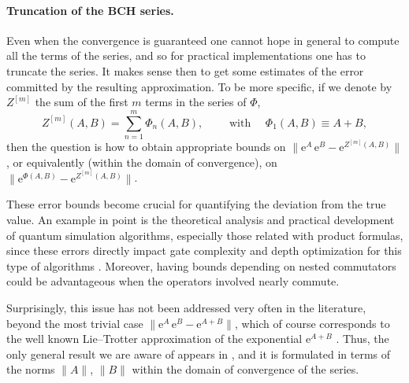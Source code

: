 \documentclass[11pt]{article}
\newcommand{\e}{\ensuremath{\mathrm{e}}}
\begin{document}
\paragraph{Truncation of the BCH series.} Even when the convergence  
is guaranteed one cannot hope in general to compute all the terms of the series, 
and so for practical implementations one has to truncate the series. It makes sense then to get some estimates of the error committed by the resulting 
approximation. To be more specific, if we denote by $Z^{[m]}$ the sum of the first $m$ terms in the series of $\Phi$, 
\begin{equation} \label{bch.2}
   Z^{[m]}(A,B) =  \sum_{n=1}^m \Phi_n(A,B),  \qquad \mbox{ with } \quad \Phi_1(A,B) \equiv A+B, 
\end{equation}
then the question is how to obtain appropriate bounds on $\|\e^{A} \, \e^{B} - \e^{Z^{[m]}(A,B)} \|$, or equivalently (within the domain of convergence), on $\|\e^{\Phi(A,B)} - \e^{Z^{[m]}(A,B)} \|$.

These error bounds become 
crucial for quantifying the deviation from the true value. An example in point is the theoretical analysis and practical development of quantum simulation algorithms, especially those related with product formulas, since these errors directly impact gate complexity and depth optimization for this type of algorithms \cite{childs21tot}. 
Moreover, having bounds depending on nested commutators could be advantageous when the operators involved nearly commute.

Surprisingly, this issue has not been addressed very often in the literature, beyond the most trivial case 
$\|\e^{A} \, \e^{B} - \e^{A+B} \|$, which of course corresponds to the
well known Lie--Trotter approximation of the exponential $\e^{A+B}$ \cite{suzuki85dfo}.  Thus, the only general result we are aware of appears in 
\cite[Theorem 5.31]{bonfiglioli12tin}, and it is formulated in terms of the norms $\|A\|$, $\|B\|$ within the domain of convergence of the series.
\end{document}
